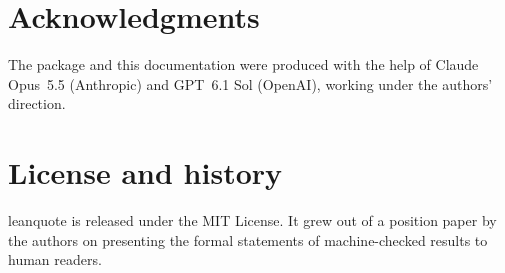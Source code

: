 \documentclass[11pt]{article}
\begin{document}
\section{Acknowledgments}

The package and this documentation were produced with the help of Claude Opus~5.5
(Anthropic) and GPT~6.1 Sol (OpenAI), working under the authors' direction.

\section{License and history}

\textsf{leanquote} is released under the MIT License. It grew out of a position paper by the
authors on presenting the formal statements of machine-checked results to human readers.
\end{document}

